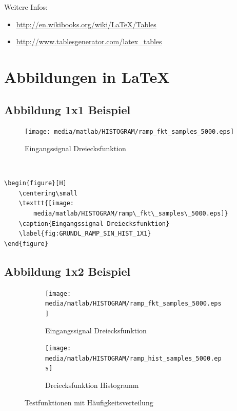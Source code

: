 \documentclass[TGAI_Laborbericht.tex]{subfiles}
\begin{document}
Weitere Infos:
\begin{itemize}
  \item \href{http://en.wikibooks.org/wiki/LaTeX/Tables}{http://en.wikibooks.org/wiki/LaTeX/Tables}
  \item \href{http://www.tablesgenerator.com/latex\_tables}{http://www.tablesgenerator.com/latex\_tables}
\end{itemize}

\newpage

\section{Abbildungen in \LaTeX}

\subsection{Abbildung 1x1 Beispiel}
\begin{figure}[H]
	\centering\small
	\texttt{[image: media/matlab/HISTOGRAM/ramp\_fkt\_samples\_5000.eps]}
	\caption{Eingangssignal Dreiecksfunktion}
	\label{fig:GRUNDL_RAMP_SIN_HIST_1X1}
\end{figure}
~

\begin{lstlisting}[style=LATEX, frame=single, caption=\LaTeX ~Befehle Abbildung \ref{fig:GRUNDL_RAMP_SIN_HIST_1X1}, captionpos=b, label=lst:FIG_1X1]
\begin{figure}[H]
	\centering\small
	\texttt{[image: 
		media/matlab/HISTOGRAM/ramp\_fkt\_samples\_5000.eps]}
	\caption{Eingangssignal Dreiecksfunktion}
	\label{fig:GRUNDL_RAMP_SIN_HIST_1X1}
\end{figure}
\end{lstlisting}
\newpage


\subsection{Abbildung 1x2 Beispiel}
\begin{figure}[H]
	\begin{subfigure}{.499\textwidth}
		\centering\small
		\texttt{[image: media/matlab/HISTOGRAM/ramp\_fkt\_samples\_5000.eps]}
		\caption{Eingangssignal Dreiecksfunktion}
		\label{fig:GRUNDL_RAMP_RAMP_1X2}
	\end{subfigure}
	\begin{subfigure}{.499\textwidth}
		\centering\small
		\texttt{[image: media/matlab/HISTOGRAM/ramp\_hist\_samples\_5000.eps]}
		\caption{Dreiecksfunktion Histogramm}
		\label{fig:GRUNDL_RAMP_HIST_1X2}
	\end{subfigure}
\caption{Testfunktionen mit Häufigkeitsverteilung}
\label{fig:GRUNDL_RAMP_SIN_HIST_1X2}
\end{figure}
\end{document}
